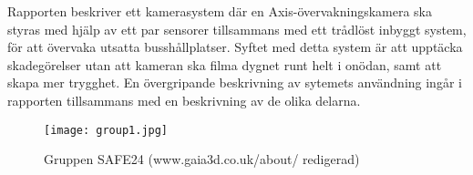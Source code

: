 


\begin{abstracts}        %
Rapporten beskriver ett kamerasystem där en Axis-övervakningskamera ska styras med hjälp av ett par sensorer tillsammans med ett trådlöst inbyggt system, för att övervaka utsatta busshållplatser. Syftet med detta system är att upptäcka skadegörelser utan att kameran ska filma dygnet runt helt i onödan, samt att skapa mer trygghet. En övergripande beskrivning av sytemets användning ingår i rapporten tillsammans med en beskrivning av de olika delarna.

\begin{figure}[h]
  \texttt{[image: group1.jpg]}
  \caption{Gruppen SAFE24 (www.gaia3d.co.uk/about/ redigerad)}
  \label{fig:group1}
\end{figure}


\end{abstracts}


